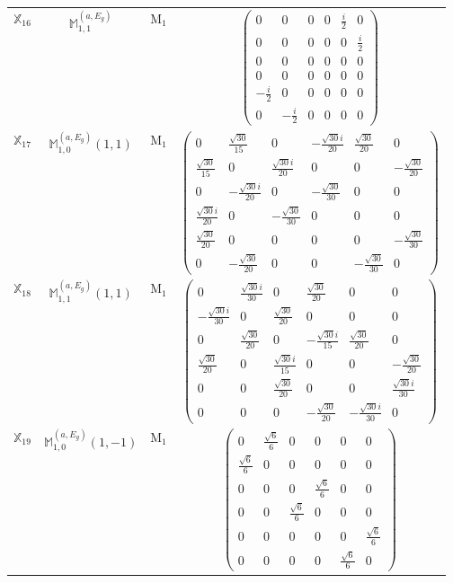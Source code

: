 \documentclass[fleqn,10pt,landscape]{article}
\begin{document}
\begin{itemize}
\begin{center}
\begin{longtable}{c|c|c|c}
$ \mathbb{X}_{16} $ & $\mathbb{M}_{1,1}^{(a,E_{g})}$ & M$_{1}$ & $\begin{pmatrix} 0 & 0 & 0 & 0 & \frac{i}{2} & 0 \\ 0 & 0 & 0 & 0 & 0 & \frac{i}{2} \\ 0 & 0 & 0 & 0 & 0 & 0 \\ 0 & 0 & 0 & 0 & 0 & 0 \\ - \frac{i}{2} & 0 & 0 & 0 & 0 & 0 \\ 0 & - \frac{i}{2} & 0 & 0 & 0 & 0 \end{pmatrix}$ \\
$ \mathbb{X}_{17} $ & $\mathbb{M}_{1,0}^{(a,E_{g})}(1,1)$ & M$_{1}$ & $\begin{pmatrix} 0 & \frac{\sqrt{30}}{15} & 0 & - \frac{\sqrt{30} i}{20} & \frac{\sqrt{30}}{20} & 0 \\ \frac{\sqrt{30}}{15} & 0 & \frac{\sqrt{30} i}{20} & 0 & 0 & - \frac{\sqrt{30}}{20} \\ 0 & - \frac{\sqrt{30} i}{20} & 0 & - \frac{\sqrt{30}}{30} & 0 & 0 \\ \frac{\sqrt{30} i}{20} & 0 & - \frac{\sqrt{30}}{30} & 0 & 0 & 0 \\ \frac{\sqrt{30}}{20} & 0 & 0 & 0 & 0 & - \frac{\sqrt{30}}{30} \\ 0 & - \frac{\sqrt{30}}{20} & 0 & 0 & - \frac{\sqrt{30}}{30} & 0 \end{pmatrix}$ \\
$ \mathbb{X}_{18} $ & $\mathbb{M}_{1,1}^{(a,E_{g})}(1,1)$ & M$_{1}$ & $\begin{pmatrix} 0 & \frac{\sqrt{30} i}{30} & 0 & \frac{\sqrt{30}}{20} & 0 & 0 \\ - \frac{\sqrt{30} i}{30} & 0 & \frac{\sqrt{30}}{20} & 0 & 0 & 0 \\ 0 & \frac{\sqrt{30}}{20} & 0 & - \frac{\sqrt{30} i}{15} & \frac{\sqrt{30}}{20} & 0 \\ \frac{\sqrt{30}}{20} & 0 & \frac{\sqrt{30} i}{15} & 0 & 0 & - \frac{\sqrt{30}}{20} \\ 0 & 0 & \frac{\sqrt{30}}{20} & 0 & 0 & \frac{\sqrt{30} i}{30} \\ 0 & 0 & 0 & - \frac{\sqrt{30}}{20} & - \frac{\sqrt{30} i}{30} & 0 \end{pmatrix}$ \\
$ \mathbb{X}_{19} $ & $\mathbb{M}_{1,0}^{(a,E_{g})}(1,-1)$ & M$_{1}$ & $\begin{pmatrix} 0 & \frac{\sqrt{6}}{6} & 0 & 0 & 0 & 0 \\ \frac{\sqrt{6}}{6} & 0 & 0 & 0 & 0 & 0 \\ 0 & 0 & 0 & \frac{\sqrt{6}}{6} & 0 & 0 \\ 0 & 0 & \frac{\sqrt{6}}{6} & 0 & 0 & 0 \\ 0 & 0 & 0 & 0 & 0 & \frac{\sqrt{6}}{6} \\ 0 & 0 & 0 & 0 & \frac{\sqrt{6}}{6} & 0 \end{pmatrix}$ \\

\end{longtable}
\end{center}
\end{itemize}
\end{document}
